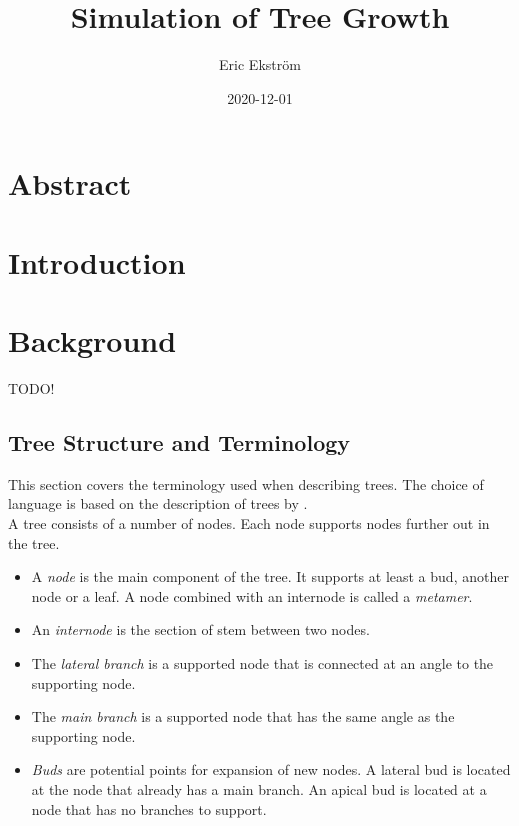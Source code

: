 \documentclass{article}
\title{Simulation of Tree Growth}
\date{2020-12-01}
\author{Eric Ekström}
\begin{document}
	
	\maketitle
	\newpage
  	
  	\section*{Abstract}
  	
  	\newpage
  	\tableofcontents
  	\newpage

  	\section{Introduction}
  		 
  	\section{Background}
  		
  		TODO!
  		
  		\subsection{Tree Structure and Terminology}
  			This section covers the terminology used when describing trees. The choice of language is based on the description of trees by \citep{barthelemy2007plant}. \\
  			
  			A tree consists of a number of nodes. Each node supports nodes further out in the tree.
  			
  			\begin{itemize}
  				\item A \textit{node} is the main component of the tree. It supports at least a bud, another node or a leaf. A node combined with an internode is called a \textit{metamer}. \citep{barthelemy2007plant}
  				\item An \textit{internode} is the section of stem between two nodes.
  				\item The \textit{lateral branch} is a supported node that is connected at an angle  to the supporting node.
  				\item The \textit{main branch} is a supported node that has the same angle as the supporting node.
  				\item \textit{Buds} are potential points for expansion of new nodes. A lateral bud is located at the node that already has a main branch. An apical bud is located at a node that has no branches to support.
  				
  			\end{itemize}
  			
\end{document}
